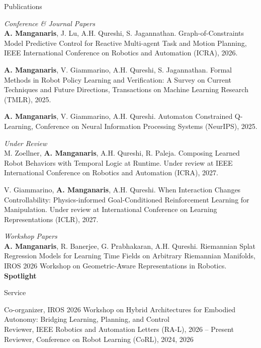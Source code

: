 \documentclass[10pt]{resume}
\newcommand{\award}[1]{{\setlength{\fboxsep}{1.5pt}\colorbox{yellow!35}{\textbf{#1}}}}
\newcommand{\pubgroup}[1]{\vspace{0.3em}\textit{#1} \\[0.1em]}
\begin{document}

\begin{rSection}{Publications}
  \small\setlength{\parskip}{0.4em}

  \pubgroup{Conference \& Journal Papers}
  \textbf{A. Manganaris}, J. Lu, A.H. Qureshi, S. Jagannathan. Graph-of-Constraints Model Predictive Control for Reactive Multi-agent Task and Motion Planning, IEEE International Conference on Robotics and Automation (ICRA), 2026.

  \textbf{A. Manganaris}, V. Giammarino, A.H. Qureshi, S. Jagannathan. Formal Methods in Robot Policy Learning and Verification: A Survey on Current Techniques and Future Directions, Transactions on Machine Learning Research (TMLR), 2025.

  \textbf{A. Manganaris}, V. Giammarino, A.H. Qureshi. Automaton Constrained Q-Learning, Conference on Neural Information Processing Systems (NeurIPS), 2025.

  \pubgroup{Under Review}
  M. Zoellner, \textbf{A. Manganaris}, A.H. Qureshi, R. Paleja. Composing Learned Robot Behaviors with Temporal Logic at Runtime. Under review at IEEE International Conference on Robotics and Automation (ICRA), 2027.

  V. Giammarino, \textbf{A. Manganaris}, A.H. Qureshi. When Interaction Changes Controllability: Physics-informed Goal-Conditioned Reinforcement Learning for Manipulation. Under review at International Conference on Learning Representations (ICLR), 2027.

  \pubgroup{Workshop Papers}
  \textbf{A. Manganaris}, R. Banerjee, G. Prabhakaran, A.H. Qureshi. Riemannian Splat Regression Models for Learning Time Fields on Arbitrary Riemannian Manifolds, IROS 2026 Workshop on Geometric-Aware Representations in Robotics. \award{Spotlight}

\end{rSection}


\begin{rSection}{Service}

  Co-organizer, IROS 2026 Workshop on Hybrid Architectures for Embodied Autonomy:
  Bridging Learning, Planning, and Control \\
  Reviewer, IEEE Robotics and Automation Letters (RA-L), 2026 -- Present \\
  Reviewer, Conference on Robot Learning (CoRL), 2024, 2026

\end{rSection}
\end{document}
